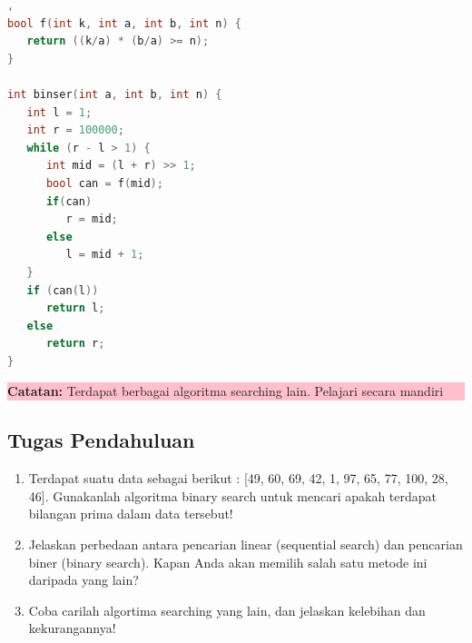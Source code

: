 \begin{lstlisting}[language=c,caption=Implementasi Binary Search],   
bool f(int k, int a, int b, int n) {
   return ((k/a) * (b/a) >= n);
}

int binser(int a, int b, int n) {
   int l = 1;
   int r = 100000;
   while (r - l > 1) {
      int mid = (l + r) >> 1;
      bool can = f(mid);
      if(can)
         r = mid;
      else
         l = mid + 1;
   }
   if (can(l))
      return l;
   else
      return r;
}
\end{lstlisting}

\begin{center}
    \colorbox{pink}{\parbox{0.8\linewidth}{\textbf{Catatan:} Terdapat berbagai algoritma searching lain. Pelajari secara mandiri}}
\end{center}

\subsection{Tugas Pendahuluan}
\begin{enumerate}
    \item Terdapat suatu data sebagai berikut : [49, 60, 69, 42, 1, 97, 65, 77, 100, 28, 46]. Gunakanlah algoritma binary search untuk mencari apakah terdapat bilangan prima dalam data tersebut!
    \item Jelaskan perbedaan antara pencarian linear (sequential search) dan pencarian biner (binary search).
          Kapan Anda akan memilih salah satu metode ini daripada yang lain?
    \item Coba carilah algortima searching yang lain, dan jelaskan kelebihan dan kekurangannya!
\end{enumerate}
